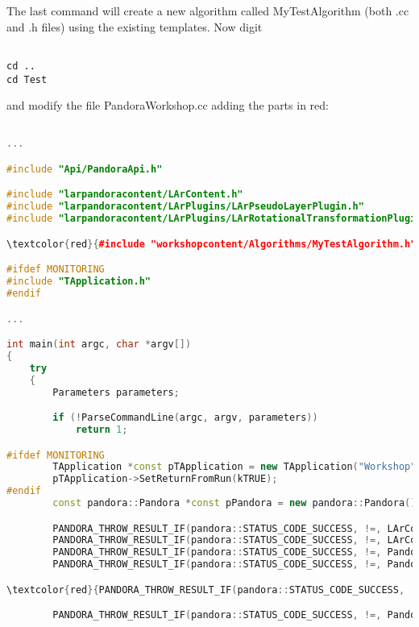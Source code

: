 The last command will create a new algorithm called MyTestAlgorithm (both .cc and .h files) using the existing templates. Now digit 

\begin{verbatim}

cd ..
cd Test

\end{verbatim}

and modify the file PandoraWorkshop.cc adding the parts in red:

\begin{lstlisting}[language=C++, caption=Python example]

...

#include "Api/PandoraApi.h"

#include "larpandoracontent/LArContent.h"
#include "larpandoracontent/LArPlugins/LArPseudoLayerPlugin.h"
#include "larpandoracontent/LArPlugins/LArRotationalTransformationPlugin.h"

\textcolor{red}{#include "workshopcontent/Algorithms/MyTestAlgorithm.h"}

#ifdef MONITORING
#include "TApplication.h"
#endif

...

int main(int argc, char *argv[])
{
    try
    {
        Parameters parameters;

        if (!ParseCommandLine(argc, argv, parameters))
            return 1;

#ifdef MONITORING
        TApplication *const pTApplication = new TApplication("Workshop", &argc, argv);
        pTApplication->SetReturnFromRun(kTRUE);
#endif
        const pandora::Pandora *const pPandora = new pandora::Pandora();

        PANDORA_THROW_RESULT_IF(pandora::STATUS_CODE_SUCCESS, !=, LArContent::RegisterAlgorithms(*pPandora));
        PANDORA_THROW_RESULT_IF(pandora::STATUS_CODE_SUCCESS, !=, LArContent::RegisterBasicPlugins(*pPandora));
        PANDORA_THROW_RESULT_IF(pandora::STATUS_CODE_SUCCESS, !=, PandoraApi::SetPseudoLayerPlugin(*pPandora, new lar_content::LArPseudoLayerPlugin));
        PANDORA_THROW_RESULT_IF(pandora::STATUS_CODE_SUCCESS, !=, PandoraApi::SetLArTransformationPlugin(*pPandora, new lar_content::LArRotationalTransformationPlugin));

\textcolor{red}{PANDORA_THROW_RESULT_IF(pandora::STATUS_CODE_SUCCESS, !=, PandoraApi::RegisterAlgorithmFactory(*pPandora, "MyTestAlgorithm", new workshop_content::MyTestAlgorithm::Factory));}

        PANDORA_THROW_RESULT_IF(pandora::STATUS_CODE_SUCCESS, !=, PandoraApi::ReadSettings(*pPandora, parameters.m_pandoraSettingsFile));


\end{lstlisting}
